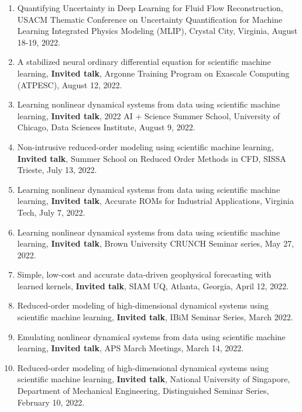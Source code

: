 \documentclass[letterpaper]{article}
\begin{document}
\begin{enumerate}
\item Quantifying Uncertainty in Deep Learning for Fluid Flow Reconstruction, USACM Thematic Conference on Uncertainty Quantification for Machine Learning Integrated Physics Modeling (MLIP), Crystal City, Virginia, August 18-19, 2022.

\item A stabilized neural ordinary differential equation for scientific machine learning, \textbf{Invited talk}, Argonne Training Program on Exascale Computing (ATPESC), August 12, 2022.

\item Learning nonlinear dynamical systems from data using scientific machine learning, \textbf{Invited talk}, 2022 AI + Science Summer School, University of Chicago, Data Sciences Institute, August 9, 2022.

\item Non-intrusive reduced-order modeling using scientific machine learning, \textbf{Invited talk}, Summer School on Reduced Order Methods in CFD, SISSA Trieste, July 13, 2022.

\item Learning nonlinear dynamical systems from data using scientific machine learning, \textbf{Invited talk}, Accurate ROMs for Industrial Applications, Virginia Tech, July 7, 2022.

\item Learning nonlinear dynamical systems from data using scientific machine learning, \textbf{Invited talk}, Brown University CRUNCH Seminar series, May 27, 2022. 

\item Simple, low-cost and accurate data-driven geophysical forecasting with learned kernels, \textbf{Invited talk}, SIAM UQ, Atlanta, Georgia, April 12, 2022.

\item Reduced-order modeling of high-dimensional dynamical systems using scientific machine learning, \textbf{Invited talk}, IBiM Seminar Series, March 2022.

\item Emulating nonlinear dynamical systems from data using scientific machine learning, \textbf{Invited talk}, APS March Meetings, March 14, 2022.

\item Reduced-order modeling of high-dimensional dynamical systems using scientific machine learning, \textbf{Invited talk}, National University of Singapore, Department of Mechanical Engineering, Distinguished Seminar Series, February 10, 2022.


\end{enumerate}
\end{document}
